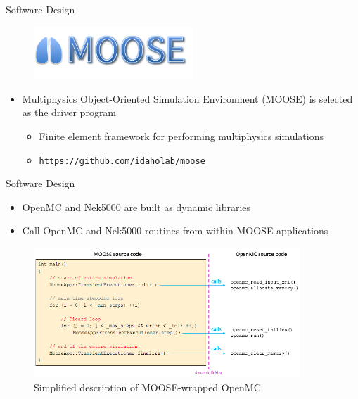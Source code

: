 \documentclass[10pt]{beamer}
\begin{document}
\begin{frame}{Software Design}
\begin{figure}
\includegraphics[width=6cm]{../Figures/Moose_Multiphysics.png}
\end{figure}
\begin{itemize}
\item Multiphysics Object-Oriented Simulation Environment (MOOSE) is selected as the driver program
	\begin{itemize}
	\item Finite element framework for performing multiphysics simulations
	\item {\tt https://github.com/idaholab/moose}
	\end{itemize}
\end{itemize}
\end{frame}

\begin{frame}{Software Design}
\begin{itemize}
\item OpenMC and Nek5000 are built as dynamic libraries
\item Call OpenMC and Nek5000 routines from within MOOSE applications
\end{itemize}
\begin{figure}
\includegraphics[width=10cm]{../Figures/moose_driver.png}
\caption{Simplified description of MOOSE-wrapped OpenMC}
\end{figure}
\end{frame}
\end{document}
